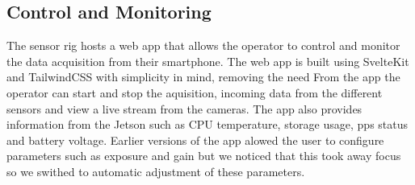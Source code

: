 \subsection{Control and Monitoring}
The sensor rig hosts a web app that allows the operator to control and monitor the data acquisition from their smartphone.
The web app is built using SvelteKit and TailwindCSS with simplicity in mind, removing the need
From the app the operator can start and stop the aquisition, incoming data from the different sensors and view a live stream from the cameras.
The app also provides information from the Jetson such as CPU temperature, storage usage, \gls{pps} status and battery voltage.
Earlier versions of the app alowed the user to configure parameters such as exposure and gain but we noticed that this took away focus so we swithed to automatic adjustment of these parameters.







